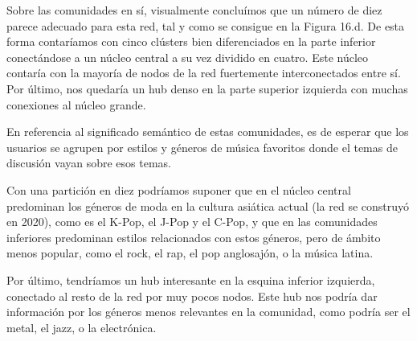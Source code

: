 


\vspace{\baselineskip}

Sobre las comunidades en sí, visualmente concluímos que un número de diez parece adecuado para esta red, tal y como se consigue en la Figura 16.d. De esta forma contaríamos con cinco clústers bien diferenciados en la parte inferior conectándose a un núcleo central a su vez dividido en cuatro. Este núcleo contaría con la mayoría de nodos de la red fuertemente interconectados entre sí. Por último, nos quedaría un hub denso en la parte superior izquierda con muchas conexiones al núcleo grande.

\vspace{\baselineskip}

En referencia al significado semántico de estas comunidades, es de esperar que los usuarios se agrupen por estilos y géneros de música favoritos donde el temas de discusión vayan sobre esos temas. 

Con una partición en diez podríamos suponer que en el núcleo central predominan los géneros de moda en la cultura asiática actual (la red se construyó en 2020), como es el K-Pop, el J-Pop y el C-Pop, y que en las comunidades inferiores predominan estilos relacionados con estos géneros, pero de ámbito menos popular, como el rock, el rap, el pop anglosajón, o la música latina.

Por último, tendríamos un hub interesante en la esquina inferior izquierda, conectado al resto de la red por muy pocos nodos. Este hub nos podría dar información por los géneros menos relevantes en la comunidad, como podría ser el metal, el jazz, o la electrónica.